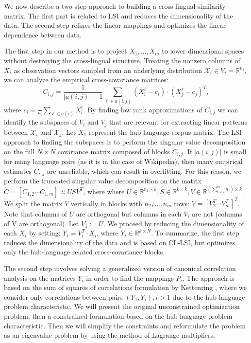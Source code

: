 \documentclass[twoside,11pt]{article}
\newcommand{\RR}{\mathbb{R}}
\begin{document}
We now describe a two step approach to building a cross-lingual similarity matrix. The first part is related to LSI and reduces the dimensionality of the data. The second step refines the linear mappings and optimizes the linear dependence between data.

The first step in our method is to project $X_1, \ldots, X_m$ to lower dimensional spaces without destroying the cross-lingual structure. Treating the nonzero columns of $X_i$ as observation vectors sampled from an underlying distribution $\mathcal{X}_i \in V_i = \RR^{n_i}$, we can analyze the empirical cross-covariance matrices:
$$C_{i,j} = \frac{1}{|a(i,j)|-1 }\sum_{\ell \in a(i,j)} (X_i^{\ell} - c_i)\cdot (X_j^{\ell} - c_j)^T,$$
 where $c_i = \frac{1}{a_i} \sum_{\ell \in a(i)}X_i^{\ell}$. By finding low rank approximations of $C_{i,j}$ we can identify the subspaces of $V_i$ and $V_j$ that are relevant for extracting linear patterns between $\mathcal{X}_i$ and $\mathcal{X}_j$. Let $X_1$ represent the hub language corpus matrix. The LSI approach to finding the subspaces is to perform the singular value decomposition on the full $N \times N$ covariance matrix composed of blocks $C_{i,j}$. If $|a(i,j)|$ is small for many language pairs (as it is in the case of Wikipedia), then many empirical estimates $C_{i,j}$ are unreliable, which can result in overfitting. For this reason, we perform the truncated singular value decomposition on the matrix $C = [C_{1,2}  \cdots  C_{1,m}] \approx U S V^T$, where where $U \in \RR^{n_1 \times k}, S \in \RR^{k \times k}, V \in \RR^{(\sum_{i=2}^m n_i) \times k}$. We split the matrix $V$ vertically in blocks with $n_2, \ldots, n_m$ rows: $V = [V_2^T  \cdots  V_m^T]^T$. Note that columns of $U$ are orthogonal but columns in each $V_i$ are not (columns of V are orthogonal). Let $V_1 := U$. We proceed by reducing the dimensionality of each $X_i$ by setting: $Y_i = V_i^T \cdot X_i$, where $Y_i \in \RR^{k\times N}$. To summarize, the first step reduces the dimensionality of the data and is based on CL-LSI, but optimizes only the hub-language related cross-covariance blocks.

The second step involves solving a generalized version of canonical correlation analysis on the matrices $Y_i$ in order to find the mappings $P_i$. The approach is based on the sum of squares of correlations formulation by Kettenring \cite{Kettenring}, where we consider only correlations between pairs $(Y_1, Y_i), i >1$ due to the hub language problem characteristic.
We will present the original unconstrained optimization problem, then a constrained formulation based on the hub language problem characteristic. Then we will simplify the constraints and reformulate
the problem as an eigenvalue problem by using the method of Lagrange multipliers.
\end{document}
